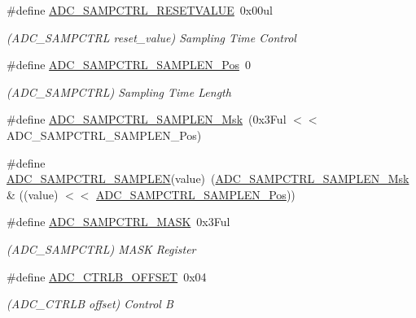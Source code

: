 \begin{DoxyCompactItemize}
\#define \mbox{\hyperlink{group___s_a_m_d21___a_d_c_gaa58117337a5b6c69aef9958ffe3d900a}{A\+D\+C\+\_\+\+S\+A\+M\+P\+C\+T\+R\+L\+\_\+\+R\+E\+S\+E\+T\+V\+A\+L\+UE}}~0x00ul
\begin{DoxyCompactList}\small\item\em (A\+D\+C\+\_\+\+S\+A\+M\+P\+C\+T\+RL reset\+\_\+value) Sampling Time Control \end{DoxyCompactList}\item 
\#define \mbox{\hyperlink{group___s_a_m_d21___a_d_c_gabcdb0d22f5636adbd1f1ef93dbdb3861}{A\+D\+C\+\_\+\+S\+A\+M\+P\+C\+T\+R\+L\+\_\+\+S\+A\+M\+P\+L\+E\+N\+\_\+\+Pos}}~0
\begin{DoxyCompactList}\small\item\em (A\+D\+C\+\_\+\+S\+A\+M\+P\+C\+T\+RL) Sampling Time Length \end{DoxyCompactList}\item 
\#define \mbox{\hyperlink{group___s_a_m_d21___a_d_c_ga7523cf54abe14bf65a648cc1cad89c92}{A\+D\+C\+\_\+\+S\+A\+M\+P\+C\+T\+R\+L\+\_\+\+S\+A\+M\+P\+L\+E\+N\+\_\+\+Msk}}~(0x3\+Ful $<$$<$ A\+D\+C\+\_\+\+S\+A\+M\+P\+C\+T\+R\+L\+\_\+\+S\+A\+M\+P\+L\+E\+N\+\_\+\+Pos)
\item 
\#define \mbox{\hyperlink{group___s_a_m_d21___a_d_c_gaa68878386ae439e0362631276472b6f1}{A\+D\+C\+\_\+\+S\+A\+M\+P\+C\+T\+R\+L\+\_\+\+S\+A\+M\+P\+L\+EN}}(value)~(\mbox{\hyperlink{group___s_a_m_d21___a_d_c_ga7523cf54abe14bf65a648cc1cad89c92}{A\+D\+C\+\_\+\+S\+A\+M\+P\+C\+T\+R\+L\+\_\+\+S\+A\+M\+P\+L\+E\+N\+\_\+\+Msk}} \& ((value) $<$$<$ \mbox{\hyperlink{group___s_a_m_d21___a_d_c_gabcdb0d22f5636adbd1f1ef93dbdb3861}{A\+D\+C\+\_\+\+S\+A\+M\+P\+C\+T\+R\+L\+\_\+\+S\+A\+M\+P\+L\+E\+N\+\_\+\+Pos}}))
\item 
\#define \mbox{\hyperlink{group___s_a_m_d21___a_d_c_ga707778fb7e26c8edc7cceb8646a9c1d9}{A\+D\+C\+\_\+\+S\+A\+M\+P\+C\+T\+R\+L\+\_\+\+M\+A\+SK}}~0x3\+Ful
\begin{DoxyCompactList}\small\item\em (A\+D\+C\+\_\+\+S\+A\+M\+P\+C\+T\+RL) M\+A\+SK Register \end{DoxyCompactList}\item 
\#define \mbox{\hyperlink{group___s_a_m_d21___a_d_c_gaa53e5615c9d9951bc7efb464caf48d1f}{A\+D\+C\+\_\+\+C\+T\+R\+L\+B\+\_\+\+O\+F\+F\+S\+ET}}~0x04
\begin{DoxyCompactList}\small\item\em (A\+D\+C\+\_\+\+C\+T\+R\+LB offset) Control B \end{DoxyCompactList}\item 

\end{DoxyCompactItemize}
